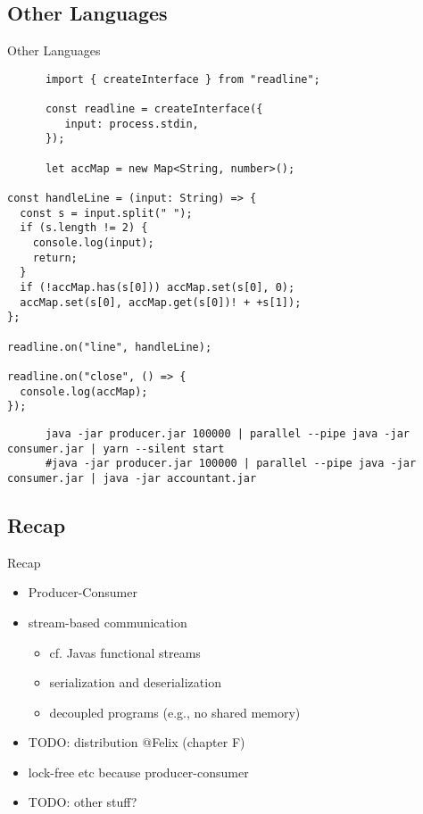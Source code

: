 \subsection{Other Languages}
\begin{frame}[fragile]{Other Languages}
   \begin{verbatim}
      import { createInterface } from "readline";

      const readline = createInterface({
         input: process.stdin,
      });

      let accMap = new Map<String, number>();

const handleLine = (input: String) => {
  const s = input.split(" ");
  if (s.length != 2) {
    console.log(input);
    return;
  }
  if (!accMap.has(s[0])) accMap.set(s[0], 0);
  accMap.set(s[0], accMap.get(s[0])! + +s[1]);
};

readline.on("line", handleLine);

readline.on("close", () => {
  console.log(accMap);
});
   \end{verbatim}
   \begin{verbatim}
      java -jar producer.jar 100000 | parallel --pipe java -jar consumer.jar | yarn --silent start
      #java -jar producer.jar 100000 | parallel --pipe java -jar consumer.jar | java -jar accountant.jar
   \end{verbatim}
\end{frame}

\subsection{Recap} %
\begin{frame}{Recap}
   \begin{itemize}[<+(1)->]
      \itemsep12pt
      \item Producer-Consumer
      \item stream-based communication \begin{itemize}
         \item cf. Javas functional streams
         \item serialization and deserialization %
         \item decoupled programs (e.g., no shared memory)
      \end{itemize}
      \item TODO: distribution @Felix (chapter F)
      \item lock-free etc because producer-consumer
      \item TODO: other stuff?
   \end{itemize}
\end{frame}

